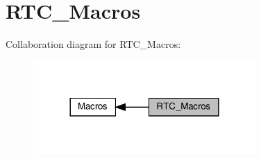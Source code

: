 \hypertarget{group___r_t_c___macros}{}\section{R\+T\+C\+\_\+\+Macros}
\label{group___r_t_c___macros}
Collaboration diagram for R\+T\+C\+\_\+\+Macros\+:\nopagebreak
\begin{figure}[H]
\begin{center}
\leavevmode
\includegraphics[width=240pt]{group___r_t_c___macros}
\end{center}
\end{figure}
